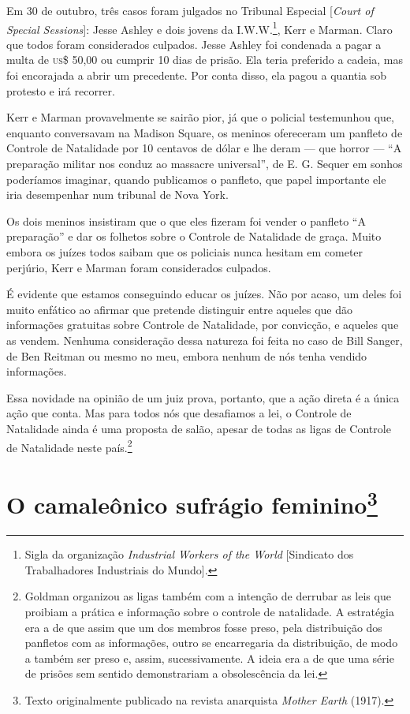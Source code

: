 Em 30 de outubro, três casos foram julgados no Tribunal Especial
{[}\emph{Court of Special Sessions}{]}: Jesse Ashley e dois jovens da
I.W.W.\footnote{Sigla da organização \emph{Industrial Workers of the
  World} {[}Sindicato dos Trabalhadores Industriais do Mundo{]}.}, Kerr
e Marman. Claro que todos foram considerados culpados. Jesse Ashley foi
condenada a pagar a multa de \textsc{us}\$ 50,00 ou cumprir 10 dias de prisão.
Ela teria preferido a cadeia, mas foi encorajada a abrir um precedente.
Por conta disso, ela pagou a quantia sob protesto e irá recorrer.

Kerr e Marman provavelmente se sairão pior, já que o policial
testemunhou que, enquanto conversavam na Madison Square, os meninos
ofereceram um panfleto de Controle de Natalidade por 10 centavos de
dólar e lhe deram --- que horror --- ``A preparação militar nos conduz
ao massacre universal'', de E. G. Sequer em sonhos poderíamos
imaginar, quando publicamos o panfleto, que papel importante ele iria
desempenhar num tribunal de Nova York.

Os dois meninos insistiram que o que eles fizeram foi vender o panfleto
``A preparação'' e dar os folhetos sobre o Controle de Natalidade de
graça. Muito embora os juízes todos saibam que os policiais nunca
hesitam em cometer perjúrio, Kerr e Marman foram considerados culpados.

É evidente que estamos conseguindo educar os juízes. Não por acaso, um
deles foi muito enfático ao afirmar que pretende distinguir entre
aqueles que dão informações gratuitas sobre Controle de Natalidade, por
convicção, e aqueles que as vendem. Nenhuma consideração dessa natureza
foi feita no caso de Bill Sanger, de Ben Reitman ou mesmo no meu, embora
nenhum de nós tenha vendido informações.

Essa novidade na opinião de um juiz prova, portanto, que a ação direta é
a única ação que conta. Mas para todos nós que desafiamos a lei, o
Controle de Natalidade ainda é uma proposta de salão, apesar de todas as
ligas de Controle de Natalidade neste país.\footnote{Goldman organizou
  as ligas também com a intenção de derrubar as leis que proibiam a
  prática e informação sobre o controle de natalidade. A estratégia era
  a de que assim que um dos membros fosse preso, pela distribuição dos panfletos com as informações, outro se encarregaria da distribuição, de modo a também ser preso e, assim, sucessivamente. A ideia era a de que uma série de prisões sem sentido demonstrariam a
  obsolescência da lei.}

\chapter{O camaleônico sufrágio feminino\footnote{Texto originalmente publicado
  na revista anarquista \emph{Mother Earth} (1917).}}

